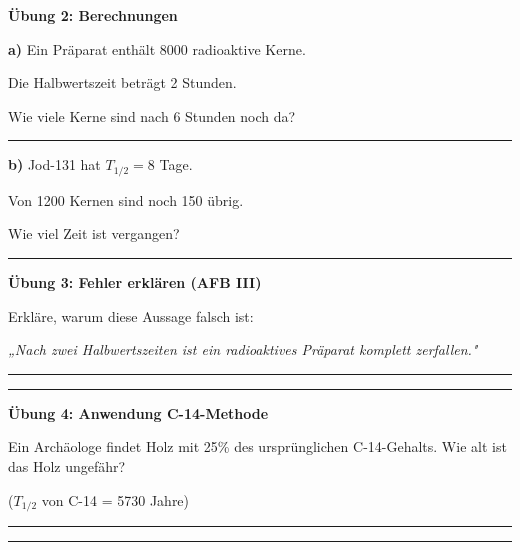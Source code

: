 \documentclass[10pt, a4paper]{article}
\newcommand{\fachfarbe}{physik}
\newcommand{\luecke}[1]{\rule{#1}{0.4pt}}
\newcommand{\abschnitt}[1]{%
    \vspace{8pt}\noindent\textbf{\textcolor{\fachfarbe}{#1}}\vspace{4pt}
}
\begin{document}
\begin{multicols}{2}
\vspace{8pt}


\abschnitt{Übung 2: Berechnungen}

\textbf{a)} Ein Präparat enthält 8000 radioaktive Kerne.

Die Halbwertszeit beträgt 2 Stunden.

Wie viele Kerne sind nach 6 Stunden noch da?

\vspace{4pt}
\luecke{5.8cm}

\vspace{6pt}

\textbf{b)} Jod-131 hat $T_{1/2} = 8$ Tage.

Von 1200 Kernen sind noch 150 übrig.

Wie viel Zeit ist vergangen?

\vspace{4pt}
\luecke{5.8cm}

\vspace{8pt}


\abschnitt{Übung 3: Fehler erklären (AFB III)}

\begin{fehlerbox}
Erkläre, warum diese Aussage falsch ist:

\vspace{4pt}

\textit{„Nach zwei Halbwertszeiten ist ein radioaktives Präparat komplett zerfallen."}

\vspace{4pt}
\luecke{5.8cm}

\vspace{4pt}
\luecke{5.8cm}
\end{fehlerbox}

\vspace{8pt}


\abschnitt{Übung 4: Anwendung C-14-Methode}

Ein Archäologe findet Holz mit 25\% des ursprünglichen C-14-Gehalts. Wie alt ist das Holz ungefähr?

($T_{1/2}$ von C-14 = 5730 Jahre)

\vspace{4pt}
\luecke{5.8cm}

\vspace{4pt}
\luecke{5.8cm}

\end{multicols}
\end{document}
